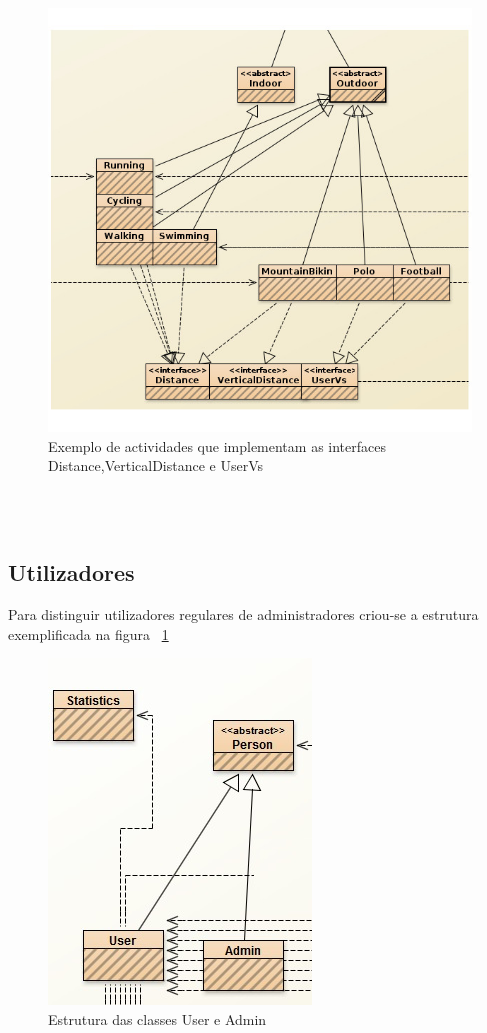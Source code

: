 \documentclass[12pt,notitlepage]{article}
\begin{document}
\begin{figure}[ht]
\centering
\includegraphics[scale=0.4]{interfaceAct.jpg}
\caption{Exemplo de actividades que implementam as interfaces Distance,VerticalDistance e UserVs}
\end{figure}
~\\~\\





\subsection{Utilizadores}
Para distinguir utilizadores regulares de administradores criou-se a estrutura exemplificada na figura ~\ref{fig:utilizadores}

\begin{figure}[htb]
\centering
\includegraphics[scale=0.6]{Statsfinalpngg.png}
\caption{Estrutura das classes User e Admin}
\label{fig:utilizadores}
\end{figure}
\end{document}
